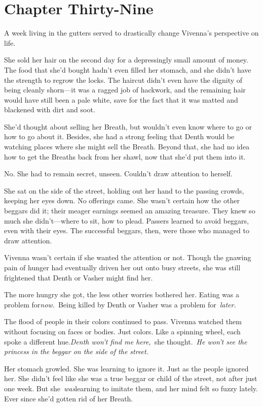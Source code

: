 \section{Chapter Thirty-Nine}

A week living in the gutters served to drastically change Vivenna’s perspective on life.

She sold her hair on the second day for a depressingly small amount of money. The food that she’d bought hadn’t even filled her stomach, and she didn’t have the strength to regrow the locks. The haircut didn’t even have the dignity of being cleanly shorn—it was a ragged job of hackwork, and the remaining hair would have still been a pale white, save for the fact that it was matted and blackened with dirt and soot.

She’d thought about selling her Breath, but wouldn’t even know where to go or how to go about it. Besides, she had a strong feeling that Denth would be watching places where she might sell the Breath. Beyond that, she had no idea how to get the Breaths back from her shawl, now that she’d put them into it.

No. She had to remain secret, unseen. Couldn’t draw attention to herself.

She sat on the side of the street, holding out her hand to the passing crowds, keeping her eyes down. No offerings came. She wasn’t certain how the other beggars did it; their meager earnings seemed an amazing treasure. They knew so much she didn’t—where to sit, how to plead. Passers learned to avoid beggars, even with their eyes. The successful beggars, then, were those who managed to draw attention.

Vivenna wasn’t certain if she wanted the attention or not. Though the gnawing pain of hunger had eventually driven her out onto busy streets, she was still frightened that Denth or Vasher might find her.

The more hungry she got, the less other worries bothered her. Eating was a problem for\textit{now.}~Being killed by Denth or Vasher was a problem for~\textit{later.}

The flood of people in their colors continued to pass. Vivenna watched them without focusing on faces or bodies. Just colors. Like a spinning wheel, each spoke a different hue.\textit{Denth won’t find me here,}~she thought.~\textit{He won’t see the princess in the beggar on the side of the street.}

Her stomach growled. She was learning to ignore it. Just as the people ignored her. She didn’t feel like she was a true beggar or child of the street, not after just one week. But she~\textit{was}learning to imitate them, and her mind felt so fuzzy lately. Ever since she’d gotten rid of her Breath.

